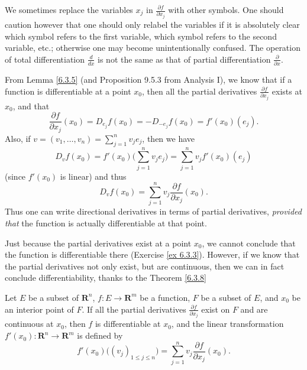 \begin{note}
    We sometimes replace the variables \(x_j\) in \(\frac{\partial f}{\partial x_j}\) with other symbols.
    One should caution however that one should only relabel the variables if it is absolutely clear which symbol refers to the first variable, which symbol refers to the second variable, etc.;
    otherwise one may become unintentionally confused.
    The operation of total differentiation \(\frac{d}{dx}\) is not the same as that of partial differentiation \(\frac{\partial}{\partial x}\).
\end{note}

\begin{additional corollary}\label{ac 6.3.2}
From Lemma \ref{6.3.5} (and Proposition 9.5.3 from Analysis I), we know that if a function is differentiable at a point \(x_0\), then all the partial derivatives \(\frac{\partial f}{\partial x_j}\) exists at \(x_0\), and that
\[
    \frac{\partial f}{\partial x_j}(x_0) = D_{e_j} f(x_0) = - D_{-e_j} f(x_0) = f'(x_0)(e_j).
\]
Also, if \(v = (v_1, \dots, v_n) = \sum_{j = 1}^n v_j e_j\), then we have
\[
    D_v f(x_0) = f'(x_0) \bigg(\sum_{j = 1}^n v_j e_j\bigg) = \sum_{j = 1}^n v_j f'(x_0)(e_j)
\]
(since \(f'(x_0)\) is linear) and thus
\[
    D_v f(x_0) = \sum_{j = 1}^n v_j \frac{\partial f}{\partial x_j}(x_0).
\]
Thus one can write directional derivatives in terms of partial derivatives, \emph{provided that} the function is actually differentiable at that point.
\end{additional corollary}

\begin{note}
    Just because the partial derivatives exist at a point \(x_0\), we cannot conclude that the function is differentiable there (Exercise \ref{ex 6.3.3}).
    However, if we know that the partial derivatives not only exist, but are continuous, then we can in fact conclude differentiability, thanks to the Theorem \ref{6.3.8}
\end{note}

\begin{theorem}\label{6.3.8}
    Let \(E\) be a subset of \(\mathbf{R}^n\), \(f : E \to \mathbf{R}^m\) be a function, \(F\) be a subset of \(E\), and \(x_0\) be an interior point of \(F\).
    If all the partial derivatives \(\frac{\partial f}{\partial x_j}\) exist on \(F\) and are continuous at \(x_0\), then \(f\) is differentiable at \(x_0\), and the linear transformation \(f'(x_0) : \mathbf{R}^n \to \mathbf{R}^m\) is defined by
    \[
        f'(x_0)\big((v_j)_{1 \leq j \leq n}\big) = \sum_{j = 1}^n v_j \frac{\partial f}{\partial x_j}(x_0).
    \]
\end{theorem}

